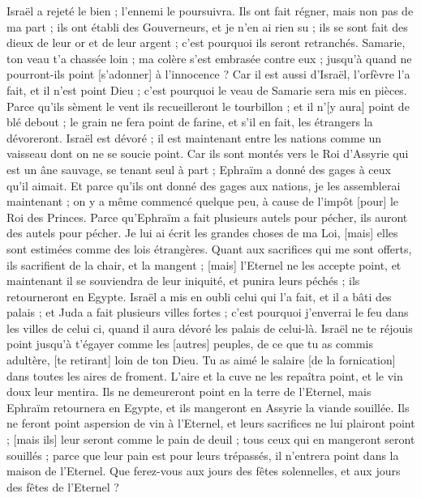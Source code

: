 \begin{multicols}{2}
Israël a rejeté le bien ; l'ennemi le poursuivra.
Ils ont fait régner, mais non pas de ma part ; ils ont établi des Gouverneurs, et je n'en ai rien su ; ils se sont fait des dieux de leur or et de leur argent ; c'est pourquoi ils seront retranchés.
Samarie, ton veau t'a chassée loin ; ma colère s'est embrasée contre eux ; jusqu'à quand ne pourront-ils point [s'adonner] à l'innocence ?
Car il est aussi d'Israël, l'orfèvre l'a fait, et il n'est point Dieu ; c'est pourquoi le veau de Samarie sera mis en pièces.
Parce qu'ils sèment le vent ils recueilleront le tourbillon ; et il n'[y aura] point de blé debout ; le grain ne fera point de farine, et s'il en fait, les étrangers la dévoreront.
Israël est dévoré ; il est maintenant entre les nations comme un vaisseau dont on ne se soucie point.
Car ils sont montés vers le Roi d'Assyrie qui est un âne sauvage, se tenant seul à part ; Ephraïm a donné des gages à ceux qu'il aimait.
Et parce qu'ils ont donné des gages aux nations, je les assemblerai maintenant ; on y a même commencé quelque peu, à cause de l'impôt [pour] le Roi des Princes.
Parce qu'Ephraïm a fait plusieurs autels pour pécher, ils auront des autels pour pécher.
Je lui ai écrit les grandes choses de ma Loi, [mais] elles sont estimées comme des lois étrangères.
Quant aux sacrifices qui me sont offerts, ils sacrifient de la chair, et la mangent ; [mais] l'Eternel ne les accepte point, et maintenant il se souviendra de leur iniquité, et punira leurs péchés ; ils retourneront en Egypte.
Israël a mis en oubli celui qui l'a fait, et il a bâti des palais ; et Juda a fait plusieurs villes fortes ; c'est pourquoi j'enverrai le feu dans les villes de celui ci, quand il aura dévoré les palais de celui-là.
\VerseOne{}Israël ne te réjouis point jusqu'à t'égayer comme les [autres] peuples, de ce que tu as commis adultère, [te retirant] loin de ton Dieu. Tu as aimé le salaire [de la fornication] dans toutes les aires de froment.
L'aire et la cuve ne les repaîtra point, et le vin doux leur mentira.
Ils ne demeureront point en la terre de l'Eternel, mais Ephraïm retournera en Egypte, et ils mangeront en Assyrie la viande souillée.
Ils ne feront point aspersion de vin à l'Eternel, et leurs sacrifices ne lui plairont point ; [mais ils] leur seront comme le pain de deuil ; tous ceux qui en mangeront seront souillés ; parce que leur pain est pour leurs trépassés, il n'entrera point dans la maison de l'Eternel.
Que ferez-vous aux jours des fêtes solennelles, et aux jours des fêtes de l'Eternel ?

\end{multicols}
